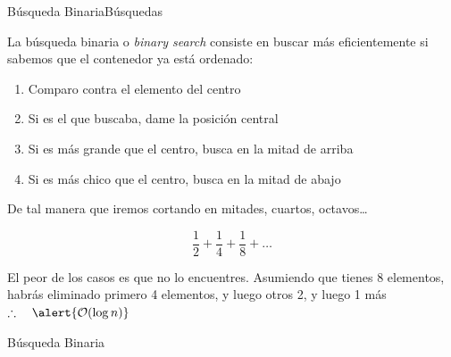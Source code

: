 \documentclass[spanish, c]{beamer}
\newcommand{\bigO}{\mathcal{O}}
\begin{document}
\begin{frame}{Búsqueda Binaria}{Búsquedas}

    La \alert{búsqueda binaria} o \textit{binary search} consiste en buscar más eficientemente si sabemos que el contenedor ya está ordenado: \pause

    \bigskip

    \begin{enumerate}[1)]
        \itemsep1.2ex
        \item Comparo contra el elemento del centro \pause
        \item Si es el que buscaba, dame la posición central \pause
        \item Si es más grande que el centro, busca en la mitad de arriba \pause
        \item Si es más chico que el centro, busca en la mitad de abajo \pause
    \end{enumerate}

    De tal manera que iremos cortando en mitades, cuartos, octavos\dots
 
    $$\frac{1}{2} + \frac{1}{4} + \frac{1}{8} + \dots$$ \pause

    El peor de los casos es que no lo encuentres. Asumiendo que tienes 8 elementos, habrás eliminado primero 4 elementos, y luego otros 2, y luego 1 más $\therefore \quad \alert{\bigO(\log n)}$
\end{frame}

\begin{frame}{Búsqueda Binaria}
\end{frame}



\end{document}
